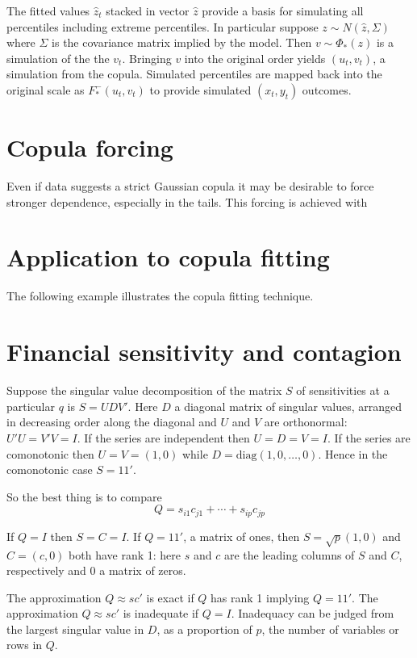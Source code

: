 \documentclass[authoryear]{elsarticle}
\newcommand{\diag}{\mathrm{diag}}
\begin{document}
The fitted values $\hat z_t$ stacked in  vector $\hat z$  provide a basis for simulating all percentiles including extreme percentiles.   In particular suppose $z\sim N(\hat z, \Sigma)$ where $\Sigma$ is the covariance matrix implied by the model.   Then $v\sim\Phi_*(z)$ is a simulation of the the $v_t$.   Bringing $v$ into the original order yields $(u_t,v_t)$, a simulation from the copula.  Simulated percentiles are  mapped back into the original scale as   $F_*^-(u_t,v_t)$ to provide simulated $(x_t,y_t)$ outcomes.  

\section{Copula forcing}

Even if data suggests a strict Gaussian copula it  may be desirable to force stronger dependence, especially in the tails. This forcing is achieved with 

\section{Application to copula fitting}

The following example illustrates the copula fitting technique.




\section{Financial sensitivity and contagion}
 

Suppose the singular value decomposition of the  matrix $S$ of sensitivities at a particular $q$ is 
$S= UDV'$.  Here  $D$ a diagonal matrix of singular values, arranged in decreasing order along the diagonal and $U$ and $V$ are orthonormal:  $U'U=V'V=I$.  If the series are independent then $U=D=V=I$.   If the series are comonotonic then $U=V=(1,0)$ while $D=\diag(1,0,\ldots,0)$.  Hence in the comonotonic case $S=11'$.

So the best thing is to compare 
$$
Q= s_{i1}c_{j1} + \cdots + s_{ip}c_{jp} 
$$

If $Q=I$ then $S=C=I$.   If $Q=11'$, a matrix of ones, then $S=\sqrt{p}(1,0)$ and $C=(c,0)$ both have rank 1:  here $s$ and $c$ are the leading columns of $S$ and $C$, respectively and 0 a matrix of zeros.

The approximation $Q\approx sc'$ is exact if $Q$ has rank 1 implying $Q=11'$.   The approximation $Q\approx sc'$ is inadequate if $Q=I$.  Inadequacy can be judged from the largest singular value in $D$, as a proportion of $p$, the number of variables or rows in $Q$.
\end{document}
